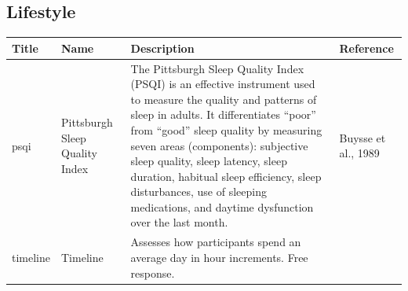 \documentclass[]{book}
\begin{document}
\hypertarget{lifestyle}{%
\subsection{Lifestyle}\label{lifestyle}}

\begin{longtable}[]{@{}llll@{}}
\toprule
\begin{minipage}[b]{0.22\columnwidth}\raggedright
Title\strut
\end{minipage} & \begin{minipage}[b]{0.27\columnwidth}\raggedright
Name\strut
\end{minipage} & \begin{minipage}[b]{0.22\columnwidth}\raggedright
Description\strut
\end{minipage} & \begin{minipage}[b]{0.18\columnwidth}\raggedright
Reference\strut
\end{minipage}\tabularnewline
\midrule
\endhead
\begin{minipage}[t]{0.22\columnwidth}\raggedright
psqi\strut
\end{minipage} & \begin{minipage}[t]{0.27\columnwidth}\raggedright
Pittsburgh Sleep Quality Index\strut
\end{minipage} & \begin{minipage}[t]{0.22\columnwidth}\raggedright
The Pittsburgh Sleep Quality Index (PSQI) is an effective instrument used to measure the quality and patterns of sleep in adults. It differentiates ``poor'' from ``good'' sleep quality by measuring seven areas (components): subjective sleep quality, sleep latency, sleep duration, habitual sleep efficiency, sleep disturbances, use of sleeping medications, and daytime dysfunction over the last month.\strut
\end{minipage} & \begin{minipage}[t]{0.18\columnwidth}\raggedright
Buysse et al., 1989\strut
\end{minipage}\tabularnewline
\begin{minipage}[t]{0.22\columnwidth}\raggedright
timeline\strut
\end{minipage} & \begin{minipage}[t]{0.27\columnwidth}\raggedright
Timeline\strut
\end{minipage} & \begin{minipage}[t]{0.22\columnwidth}\raggedright
Assesses how participants spend an average day in hour increments. Free response.\strut

\end{minipage}
\end{longtable}
\end{document}
